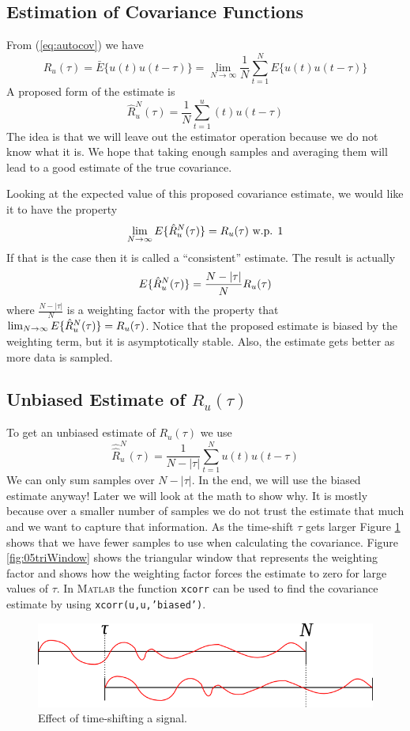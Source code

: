 \subsection{Estimation of Covariance Functions}
From (\ref{eq:autocov}) we have
$$R_u(\tau) = \bar{E}\{u(t)u(t-\tau)\} = \lim_{N\to\infty}\frac{1}{N}\sum_{t=1}^N E\{u(t)u(t-\tau)\}$$
A proposed form of the estimate is
$$\hat{R}_u^N(\tau) = \frac{1}{N}\sum_{t=1}^u(t)u(t-\tau)$$
The idea is that we will leave out the estimator operation because we do not know what it is. We hope that taking enough samples and averaging them will lead to a good estimate of the true covariance.

Looking at the expected value of this proposed covariance estimate, we would like it to have the property
$$\lim_{N\to\infty} E\{\hat{R}_u^N(\tau)\} = R_u(\tau) \text{ w.p. } 1$$
If that is the case then it is called a ``consistent'' estimate. The result is actually
\begin{align}
\label{eq:autocovest}
E\{\hat{R}_u^N(\tau)\} = \frac{N-|\tau|}{N}R_u(\tau)
\end{align}
where $\frac{N-|\tau|}{N}$ is a weighting factor with the property that $\lim_{N\to\infty}E\{\hat{R}_u^N(\tau)\}=R_u(\tau)$. Notice that the proposed estimate is biased by the weighting term, but it is asymptotically stable. Also, the estimate gets better as more data is sampled.

\subsection{Unbiased Estimate of $R_u(\tau)$}
To get an unbiased estimate of $R_u(\tau)$ we use
$$\hat{\hat{R}}_u^N(\tau) = \frac{1}{N-|\tau|}\sum_{t=1}^Nu(t)u(t-\tau)$$
We can only sum samples over $N-|\tau|$. In the end, we will use the biased estimate anyway! Later we will look at the math to show why. It is mostly because over a smaller number of samples we do not trust the estimate that much and we want to capture that information. As the time-shift $\tau$ gets larger Figure \ref{fig:05timeShift} shows that we have fewer samples to use when calculating the covariance. Figure \ref{fig:05triWindow} shows the triangular window that represents the weighting factor and shows how the weighting factor forces the estimate to zero for large values of $\tau$. In \textsc{Matlab} the function \texttt{xcorr} can be used to find the covariance estimate by using \texttt{xcorr(u,u,'biased')}.
\begin{figure}[ht!]
	\centering
	\includegraphics[width=.6\textwidth]{images/05timeShift}
	\caption{Effect of time-shifting a signal.}
	\label{fig:05timeShift}
\end{figure}

